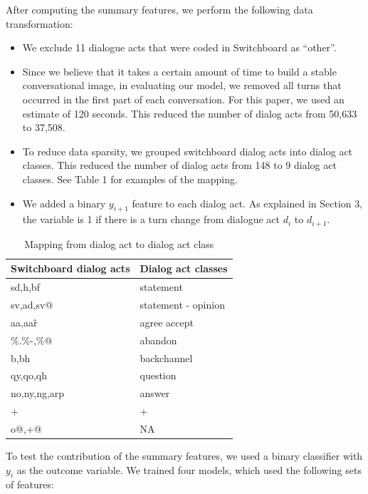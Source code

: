   After computing the summary features, we perform the following data transformation:
    \begin{itemize}[leftmargin=1em]
    \item We exclude 11 dialogue acts that were coded in Switchboard as ``other''.
    \item Since we believe that it takes a certain amount of time to build a stable conversational image, in evaluating our model, we removed all turns that occurred in the first part of each conversation. For this paper, we used an estimate of 120 seconds. This reduced the number of dialog acts from 50,633 to 37,508.
    \item To reduce data sparsity, we grouped switchboard dialog acts into dialog act classes. This reduced the number of dialog acts from 148 to 9 dialog act classes. See Table 1 for examples of the mapping.
    \item We added a binary $y_{i+1}$ feature to each dialog act. As explained in Section 3, the variable is 1 if there is a turn change from dialogue act $d_i$ to $d_{i+1}$.

    \end{itemize}
    \begin{table}
     \begin{center}
    \begin{tabular}{ |p{2cm}||p{3cm} | }
    \hline
Switchboard dialog acts &  Dialog act classes  \\
    \hline
sd,h,bf      & statement   \\
sv,ad,sv@    & statement - opinion  \\
aa,aa\^r     & agree accept \\
\%.\%-,\%@   & abandon      \\
b,bh         & backchannel  \\
qy,qo,qh     & question     \\
no,ny,ng,arp & answer       \\
+            & +            \\
o@,+@        & NA           \\
  \hline
\end{tabular}
\end{center}\vspace{-0.5em}
\caption{Mapping from dialog act to dialog act class}
\label{tab:mapping}
\end{table}


    To test the contribution of the summary features, we used a binary classifier with
    $y_i$ as the outcome variable. We trained four models, which used the following sets of features:

